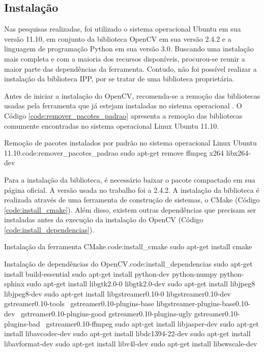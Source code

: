 \subsection{Instalação}
\label{section:install_opencv}

Nas pesquisas realizadas, foi utilizado o sistema operacional Ubuntu em sua versão 11.10, em conjunto da biblioteca OpenCV em sua versão 2.4.2 e a linguagem de programação Python em sua versão 3.0. Buscando uma instalação mais completa e com a maioria dos recursos disponíveis, procurou-se reunir a maior parte das dependências da ferramenta. Contudo, não foi possível realizar a instalação da biblioteca IPP, por se tratar de uma biblioteca proprietária.

Antes de iniciar a instalação do OpenCV, recomenda-se a remoção das bibliotecas usadas pela ferramenta que já estejam instaladas no sistema operacional \cite{ERALP}. O Código \ref{code:remover_pacotes_padrao} apresenta a remoção das bibliotecas comumente encontradas no sistema operacional Linux Ubuntu 11.10.

\begin{terminal}{Remoção de pacotes instalados por padrão no sistema operacional Linux Ubuntu 11.10.}{code:remover_pacotes_padrao}
sudo apt-get remove ffmpeg x264 libx264-dev
\end{terminal}

Para a instalação da biblioteca, é necessário baixar o pacote compactado em sua página oficial. A versão usada no trabalho foi a 2.4.2. A instalação da biblioteca é realizada através de uma ferramenta de construção de sistemas, o CMake (Código \ref{code:install_cmake}). Além disso, existem outras dependências que precisam ser instaladas antes da execução da instalação do OpenCV (Código \ref{code:install_dependencias}).

\begin{terminal}{Instalação da ferramenta CMake.}{code:install_cmake}
sudo apt-get install cmake
\end{terminal}

\begin{terminal}{Instalação de dependências do OpenCV.}{code:install_dependencias}
sudo apt-get install build-essential
sudo apt-get install python-dev python-numpy python-sphinx
sudo apt-get install libgtk2.0-0 libgtk2.0-dev
sudo apt-get install libjpeg8 libjpeg8-dev
sudo apt-get install libgstreamer0.10-0 libgstreamer0.10-dev gstreamer0.10-tools \
  gstreamer0.10-plugins-base libgstreamer-plugins-base0.10-dev \
  gstreamer0.10-plugins-good gstreamer0.10-plugins-ugly gstreamer0.10-plugins-bad \
  gstreamer0.10-ffmpeg
sudo apt-get install libjasper-dev
sudo apt-get install libavcodec-dev
sudo apt-get install libdc1394-22-dev
sudo apt-get install libavformat-dev
sudo apt-get install libv4l-dev
sudo apt-get install libswscale-dev
\end{terminal}

